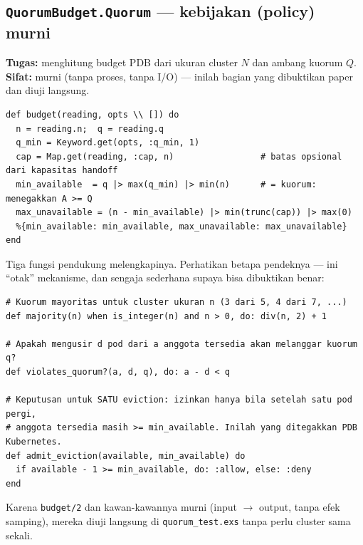 \documentclass[11pt]{article}
\newcommand{\code}[1]{\texttt{\small #1}}
\begin{document}
\subsection{\texttt{QuorumBudget.Quorum} --- kebijakan (policy) murni}
\label{sec:mod-quorum}
\textbf{Tugas:} menghitung budget PDB dari ukuran cluster $N$ dan ambang kuorum $Q$. \textbf{Sifat:}
murni (tanpa proses, tanpa I/O) --- inilah bagian yang dibuktikan paper dan diuji langsung.
\begin{lstlisting}[style=ex]
def budget(reading, opts \\ []) do
  n = reading.n;  q = reading.q
  q_min = Keyword.get(opts, :q_min, 1)
  cap = Map.get(reading, :cap, n)                 # batas opsional dari kapasitas handoff
  min_available  = q |> max(q_min) |> min(n)      # = kuorum: menegakkan A >= Q
  max_unavailable = (n - min_available) |> min(trunc(cap)) |> max(0)
  %{min_available: min_available, max_unavailable: max_unavailable}
end
\end{lstlisting}
Tiga fungsi pendukung melengkapinya. Perhatikan betapa pendeknya --- ini ``otak'' mekanisme, dan
sengaja sederhana supaya bisa dibuktikan benar:
\begin{lstlisting}[style=ex]
# Kuorum mayoritas untuk cluster ukuran n (3 dari 5, 4 dari 7, ...)
def majority(n) when is_integer(n) and n > 0, do: div(n, 2) + 1

# Apakah mengusir d pod dari a anggota tersedia akan melanggar kuorum q?
def violates_quorum?(a, d, q), do: a - d < q

# Keputusan untuk SATU eviction: izinkan hanya bila setelah satu pod pergi,
# anggota tersedia masih >= min_available. Inilah yang ditegakkan PDB Kubernetes.
def admit_eviction(available, min_available) do
  if available - 1 >= min_available, do: :allow, else: :deny
end
\end{lstlisting}
Karena \code{budget/2} dan kawan-kawannya murni (input $\rightarrow$ output, tanpa efek samping),
mereka diuji langsung di \code{quorum\_test.exs} tanpa perlu cluster sama sekali.
\end{document}
